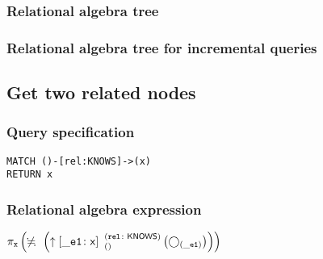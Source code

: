 \subsubsection*{Relational algebra tree}


\subsubsection*{Relational algebra tree for incremental queries}


\subsection{Get two related nodes}

\subsubsection*{Query specification}

\begin{lstlisting}
MATCH ()-[rel:KNOWS]->(x)
RETURN x
\end{lstlisting}

\subsubsection*{Relational algebra expression}

$\projection{\var{x}} \left(\alldifferent{} \left(\expandout{\_e1}{x}{}{rel}{KNOWS} \left(\getvertices{\_e1}{}\right)\right)\right)$

